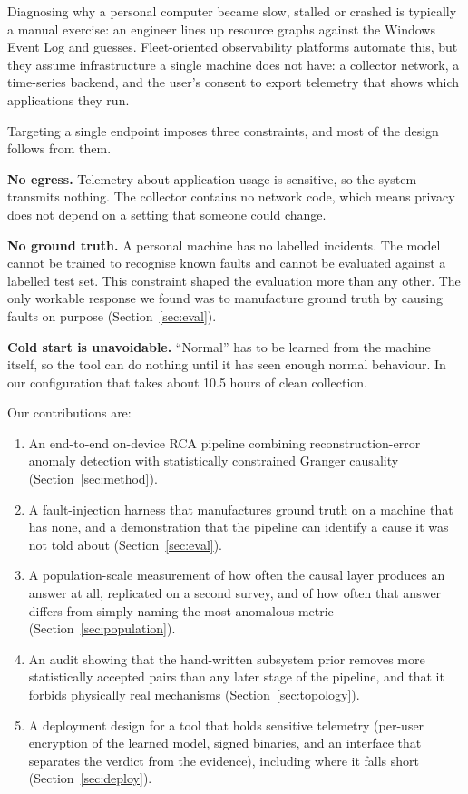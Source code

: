 \documentclass[conference,a4paper]{IEEEtran}
\begin{document}
Diagnosing why a personal computer became slow, stalled or crashed is
typically a manual exercise: an engineer lines up resource graphs against the
Windows Event Log and guesses. Fleet-oriented observability platforms automate
this, but they assume infrastructure a single machine does not have: a
collector network, a time-series backend, and the user's consent to export
telemetry that shows which applications they run.

Targeting a single endpoint imposes three constraints, and most of the design
follows from them.

\textbf{No egress.} Telemetry about application usage is sensitive, so the
system transmits nothing. The collector contains no network code, which means
privacy does not depend on a setting that someone could change.

\textbf{No ground truth.} A personal machine has no labelled incidents. The
model cannot be trained to recognise known faults and cannot be evaluated
against a labelled test set. This constraint shaped the evaluation more than
any other. The only workable response we found was to manufacture ground truth
by causing faults on purpose (Section~\ref{sec:eval}).

\textbf{Cold start is unavoidable.} ``Normal'' has to be learned from the
machine itself, so the tool can do nothing until it has seen enough normal
behaviour. In our configuration that takes about 10.5 hours of clean
collection.

Our contributions are:

\begin{enumerate}
  \item An end-to-end on-device RCA pipeline combining reconstruction-error
        anomaly detection with statistically constrained Granger causality
        (Section~\ref{sec:method}).
  \item A fault-injection harness that manufactures ground truth on a machine
        that has none, and a demonstration that the pipeline can identify a
        cause it was not told about (Section~\ref{sec:eval}).
  \item A population-scale measurement of how often the causal layer produces
        an answer at all, replicated on a second survey, and of how often
        that answer differs from simply naming the most anomalous metric
        (Section~\ref{sec:population}).
  \item An audit showing that the hand-written subsystem prior removes more
        statistically accepted pairs than any later stage of the pipeline, and
        that it forbids physically real mechanisms
        (Section~\ref{sec:topology}).
  \item A deployment design for a tool that holds sensitive telemetry
        (per-user encryption of the learned model, signed binaries, and an
        interface that separates the verdict from the evidence), including
        where it falls short (Section~\ref{sec:deploy}).
\end{enumerate}
\end{document}
